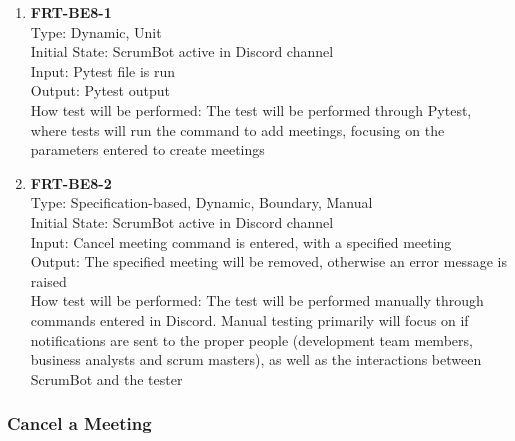 \documentclass[12pt, titlepage]{article}
\begin{document}
\begin{enumerate}
    \item{\textbf{FRT-BE8-1}}\\
    Type: Dynamic, Unit\\
    Initial State: ScrumBot active in Discord channel\\
    Input: Pytest file is run\\
    Output: Pytest output\\
    How test will be performed: The test will be performed through Pytest, where tests will run the command to add meetings, focusing on the parameters entered to create meetings\\
    
    \item{\textbf{FRT-BE8-2}}\\
    Type: Specification-based, Dynamic, Boundary, Manual\\
    Initial State: ScrumBot active in Discord channel\\
    Input: Cancel meeting command is entered, with a specified meeting\\
    Output: The specified meeting will be removed, otherwise an error message is raised\\
    How test will be performed: The test will be performed manually through commands entered in Discord. Manual testing primarily will focus on if notifications are sent to the proper people (development team members, business analysts and scrum masters), as well as the interactions between ScrumBot and the tester\\
\end{enumerate}

\subsubsection{Cancel a Meeting}
\end{document}
